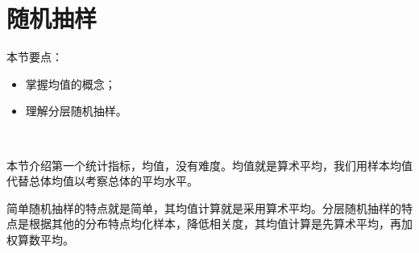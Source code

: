 \section{随机抽样}

本节要点：
\begin{itemize}
    \item 掌握均值的概念；
    \item 理解分层随机抽样。
\end{itemize}

~

本节介绍第一个统计指标，均值，没有难度。均值就是算术平均，我们用样本均值代替总体均值以考察总体的平均水平。

简单随机抽样的特点就是简单，其均值计算就是采用算术平均。分层随机抽样的特点是根据其他的分布特点均化样本，降低相关度，其均值计算是先算术平均，再加权算数平均。




